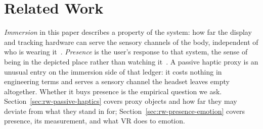 
\section{Related Work}
\label{sec:related-work}

\emph{Immersion} in this paper describes a property of the system: how far the display and tracking
hardware can serve the sensory channels of the body, independent of who is
wearing it~\cite{Slater.1997}. \emph{Presence} is the user's response to that
system, the sense of being in the depicted place rather than watching
it~\cite{Slater.1997, Skarbez.2017}. A passive haptic proxy is an unusual entry
on the immersion side of that ledger: it costs nothing in engineering terms and
serves a sensory channel the headset leaves empty altogether. Whether it buys presence is the empirical question we ask.
Section~\ref{sec:rw-passive-haptics} covers proxy objects and how far they may
deviate from what they stand in for; Section~\ref{sec:rw-presence-emotion}
covers presence, its measurement, and what VR does to emotion.



